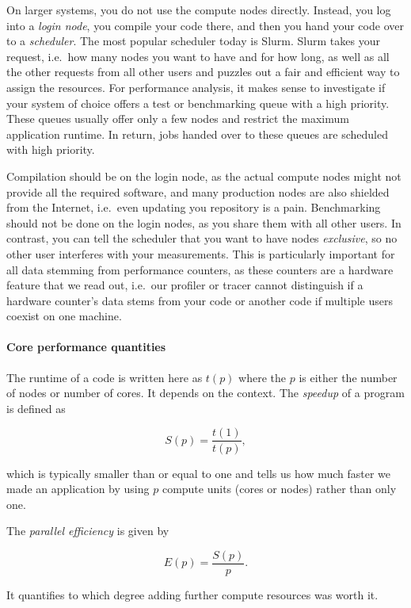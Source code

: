 On larger systems, you do not use the compute nodes directly.
Instead, you log into a \emph{login node}, you compile your code there, and
then you hand your code over to a \emph{scheduler}.
The most popular scheduler today is Slurm.
Slurm takes your request, i.e.~how many nodes you want to have and for how long,
as well as all the other requests from all other users and puzzles out a fair
and efficient way to assign the resources.
For performance analysis, it makes sense to investigate if your system of choice
offers a test or benchmarking queue with a high priority.
These queues usually offer only a few nodes and restrict the maximum application
runtime.
In return, jobs handed over to these queues are scheduled with high priority.


Compilation should be on the login node, as the actual compute nodes might not
provide all the required software, and many production nodes are also shielded
from the Internet, i.e.~even updating you repository is a pain.
Benchmarking should not be done on the login nodes, as you share them with all
other users. 
In contrast, you can tell the scheduler that you want to have nodes
\emph{exclusive}, so no other user interferes with your measurements.
This is particularly important for all data stemming from performance counters,
as these counters are a hardware feature that we read out, i.e.~our profiler or
tracer cannot distinguish if a hardware counter's data stems from your code or
another code if multiple users coexist on one machine.



\paragraph{Core performance quantities}
\label{section:terminology:hpc-terms:core-terms}

The runtime of a code is written here as $t(p)$ where the $p$ is either the
number of nodes or number of cores.
It depends on the context.
The \emph{speedup} of a program is defined as 

\begin{equation}
  \label{equation:hpc-terms:speedup}
  S(p) = \frac{t(1)}{t(p)},
\end{equation}

\noindent
which is typically smaller than or equal to one and tells us how much faster we made
an application by using $p$ compute units (cores or nodes) rather than only one.

The \emph{parallel efficiency} is given by 

\begin{equation}
  \label{equation:hpc-terms:efficiency}
  E(p) = \frac{S(p)}{p}.
\end{equation}

\noindent
It quantifies to which degree adding further compute resources was worth it.